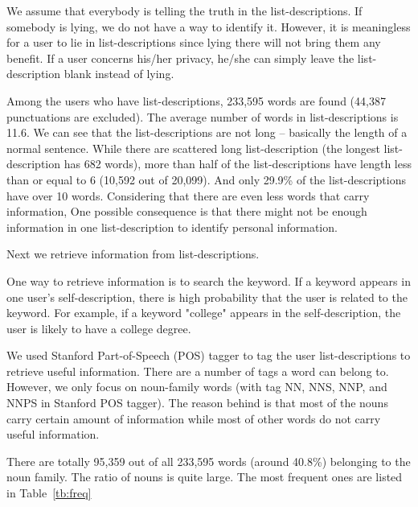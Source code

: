 We assume that everybody is telling the truth in the list-descriptions. If somebody is lying, we do not have a way to identify it. However, it is meaningless for a user to lie in list-descriptions since lying there will not bring them any benefit. If a user concerns his/her privacy, he/she can simply leave the list-description blank instead of lying.

Among the users who have list-descriptions, 233,595 words are found (44,387 punctuations are excluded). The average number of words in list-descriptions is 11.6. We can see that the list-descriptions are not long -- basically the length of a normal sentence. While there are scattered long list-description (the longest list-description has 682 words), more than half of the list-descriptions have length less than or equal to 6 (10,592 out of 20,099). And only 29.9\% of the list-descriptions have over 10 words. Considering that there are even less words that carry information, One possible consequence is that there might not be enough information in one list-description to identify personal information.

Next we retrieve information from list-descriptions. 

One way to retrieve information is to search the keyword. If a keyword appears in one user's self-description, there is high probability that the user is related to the keyword. For example, if a keyword "college" appears in the self-description, the user is likely to have a college degree. 

We used Stanford Part-of-Speech (POS) tagger \cite{toutanova2003feature} to tag the user list-descriptions to retrieve useful information. There are a number of tags a word can belong to. However, we only focus on noun-family words (with tag NN, NNS, NNP, and NNPS in Stanford POS tagger). The reason behind is that most of the nouns carry certain amount of information while most of other words do not carry useful information. 

There are totally 95,359 out of all 233,595 words (around 40.8\%) belonging to the noun family. The ratio of nouns is quite large. The most frequent ones are listed in Table~\ref{tb:freq}

